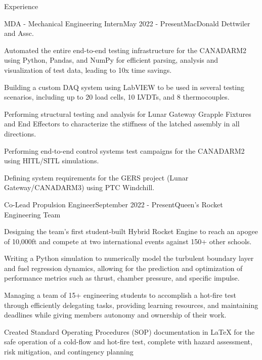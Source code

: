 \documentclass{resume} %
\begin{document}

\begin{rSection}{Experience}

\begin{rSubsection}{MDA - Mechanical Engineering Intern}{May 2022 - Present}{MacDonald Dettwiler and Assc.}{}

\item Automated the entire end-to-end testing infrastructure for the CANADARM2 using Python, Pandas, and NumPy for efficient parsing, analysis and visualization of test data, leading to 10x time savings.
\item Building a custom DAQ system using LabVIEW to be used in several testing scenarios, including up to 20 load cells, 10 LVDTs, and 8 thermocouples.
\item Performing structural testing and analysis for Lunar Gateway Grapple Fixtures and End Effectors to characterize the stiffness of the latched assembly in all directions.
\item Performing end-to-end control systems test campaigns for the CANADARM2 using HITL/SITL simulations.
\item Defining system requirements for the GERS project (Lunar Gateway/CANADARM3) using PTC Windchill.

\end{rSubsection}

\begin{rSubsection}{Co-Lead Propulsion Engineer}{September 2022 - Present}{Queen's Rocket Engineering Team}{}
\item Designing the team's first student-built Hybrid Rocket Engine to reach an apogee of 10,000ft and compete at two international events against 150+ other schools.
\item Writing a Python simulation to numerically model the turbulent boundary layer and fuel regression dynamics, allowing for the prediction and optimization of performance metrics such as thrust, chamber pressure, and specific impulse.
\item Managing a team of 15+ engineering students to accomplish a hot-fire test through efficiently delegating tasks, providing learning resources, and maintaining deadlines while giving members autonomy and ownership of their work.
\item Created Standard Operating Procedures (SOP) documentation in LaTeX for the safe operation of a cold-flow and hot-fire test, complete with hazard assessment, risk mitigation, and contingency planning
\end{rSubsection}


\end{rSection}
\end{document}
